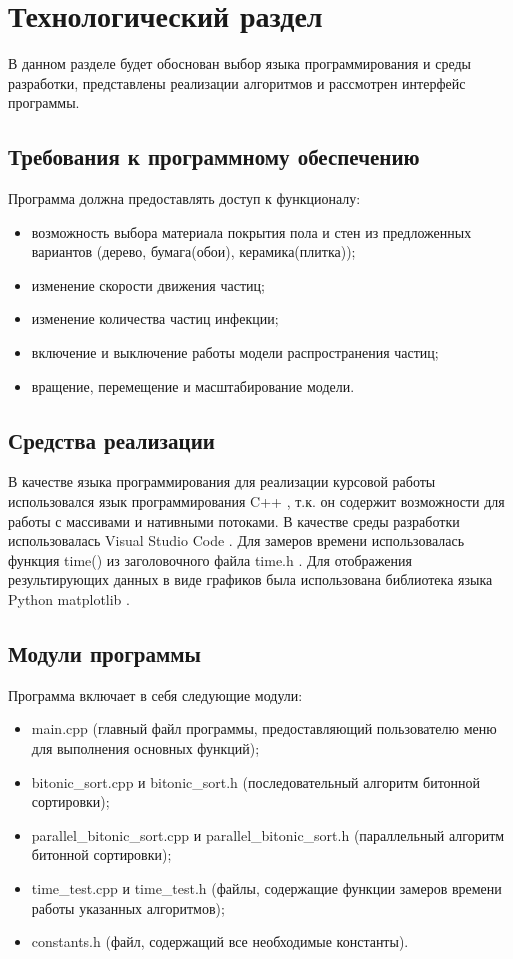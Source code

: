 \chapter{Технологический раздел}
\label{cha:impl}

В данном разделе будет обоснован выбор языка программирования и среды разработки, представлены реализации алгоритмов и рассмотрен интерфейс программы.

\section{Требования к программному обеспечению}

Программа должна предоставлять доступ к функционалу:

\begin{itemize}
	\item возможность выбора материала покрытия пола и стен из предложенных вариантов (дерево, бумага(обои), керамика(плитка));
	\item изменение скорости движения частиц;
	\item изменение количества частиц инфекции;
	\item включение и выключение работы модели распространения частиц;
	\item вращение, перемещение и масштабирование модели.
\end{itemize}

\section{Средства реализации}

В качестве языка программирования для реализации курсовой работы использовался язык программирования C++ \cite{cplusplus}, т.к. он содержит возможности для работы с массивами и нативными потоками. В качестве среды разработки использовалась Visual Studio Code \cite{vscode}. Для замеров времени  использовалась функция time() из заголовочного файла time.h \cite{cplusplus}. Для отображения результирующих данных в виде графиков была использована библиотека языка Python matplotlib \cite{matplotlib}.

\section{Модули программы}

Программа включает в себя следующие модули:
\begin{itemize}
	\item main.cpp (главный файл программы, предоставляющий пользователю меню для выполнения основных функций);
	\item bitonic\_sort.cpp и bitonic\_sort.h (последовательный алгоритм битонной сортировки);
	\item parallel\_bitonic\_sort.cpp и parallel\_bitonic\_sort.h (параллельный алгоритм битонной сортировки);
	\item time\_test.cpp и time\_test.h (файлы, содержащие функции замеров времени работы указанных алгоритмов);
	\item constants.h (файл, содержащий все необходимые константы).
\end{itemize}

